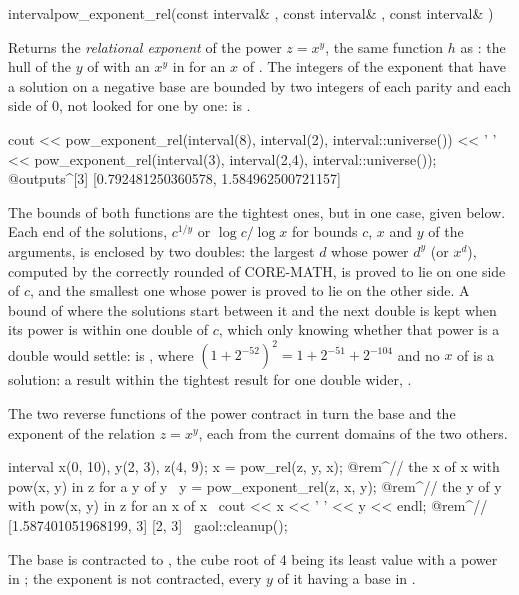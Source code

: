 \begin{deffun}{interval}{pow\_exponent\_rel}{(const interval\& , const interval\& , const interval\& )}
  \begin{operation}
  \end{operation}
  Returns the \emph{relational exponent} of the power $z=x^y$, the same
  function $h$ as : the hull of the $y$ of  with an
  $x^y$ in  for an $x$ of .\newinvfive{} The integers of the
  exponent that have a solution on a negative base are bounded by two
  integers of each parity and each side of $0$, not looked for one by one:
   is .
\begin{example}
cout << pow_exponent_rel(interval(8), interval(2), interval::universe()) << ' '
     << pow_exponent_rel(interval(3), interval(2,4), interval::universe());
@outputs^[3] [0.792481250360578, 1.584962500721157]~
\end{example}
  The bounds of both functions are the tightest ones, but in one case, given below. Each end of the
  solutions, $c^{1/y}$ or $\log c/\log x$ for bounds $c$, $x$ and $y$ of
  the arguments, is enclosed by two doubles: the largest $d$ whose power $d^y$
  (or $x^d$), computed by the correctly rounded  of CORE-MATH, is
  proved to lie on one side of $c$, and the smallest one whose power is proved
  to lie on the other side. A bound of  where the
  solutions start between it and the next double is kept when its power is
  within one double of $c$, which only knowing whether that power is a
  double would settle:
   is , where
  $(1+2^{-52})^2=1+2^{-51}+2^{-104}$ and no $x$ of  is a
  solution: a result within the tightest result for  one double wider,
  .
\end{deffun}

\begin{Ex}\label{ex:arithmetic-pow-rel}
The two reverse functions of the power contract in turn the base and the
exponent of the relation $z=x^y$, each from the current domains of the two
others.
\begin{example}
interval x(0, 10), y(2, 3), z(4, 9);
x = pow_rel(z, y, x);            @rem^// the x of x with pow(x, y) in z for a y of y~
y = pow_exponent_rel(z, x, y);   @rem^// the y of y with pow(x, y) in z for an x of x~
cout << x << ' ' << y << endl;   @rem^// [1.587401051968199, 3] [2, 3]~
gaol::cleanup();
\end{example}
The base is contracted to , the cube root of 4
being its least value with a power in ; the exponent  is
not contracted, every $y$ of it having a base in .
\end{Ex}

